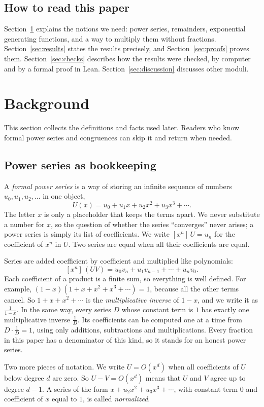 \documentclass[11pt,a4paper]{article}
\theoremstyle{definition}
\theoremstyle{remark}
\newcommand{\coeff}[2]{[x^{#1}]\,#2}
\begin{document}
\subsection{How to read this paper}
Section~\ref{sec:background} explains the notions we need: power series, remainders, exponential generating
functions, and a way to multiply them without fractions. Section~\ref{sec:results} states the results precisely, and
Section~\ref{sec:proofs} proves them. Section~\ref{sec:checks} describes how the results were checked, by computer
and by a formal proof in Lean. Section~\ref{sec:discussion} discusses other moduli.
\section{Background}\label{sec:background}
This section collects the definitions and facts used later. Readers who know formal power series and congruences can skip it and return when needed.
\subsection{Power series as bookkeeping}
A \emph{formal power series} is a way of storing an infinite sequence of numbers $u_0,u_1,u_2,\dots$ in one object,
\[
U(x)=u_0+u_1x+u_2x^2+u_3x^3+\cdots .
\]
The letter $x$ is only a placeholder that keeps the terms apart. We never substitute a number for $x$, so the question
of whether the series ``converges'' never arises; a power series is simply its list of coefficients. We write
$\coeff{n}{U}=u_n$ for the coefficient of $x^n$ in $U$. Two series are equal when all their coefficients are equal.

Series are added coefficient by coefficient and multiplied like polynomials:
\[
\coeff{n}{(UV)}=u_0v_n+u_1v_{n-1}+\cdots+u_nv_0 .
\]
Each coefficient of a product is a finite sum, so everything is well defined. For example,
$(1-x)(1+x+x^2+x^3+\cdots)=1$, because all the other terms cancel. So $1+x+x^2+\cdots$ is the
\emph{multiplicative inverse} of $1-x$, and we write it as $\frac{1}{1-x}$. In the same way, every series $D$ whose
constant term is $1$ has exactly one multiplicative inverse $\frac1D$. Its coefficients can be computed one at a time
from $D\cdot\frac1D=1$, using only additions, subtractions and multiplications. Every fraction in this paper has a
denominator of this kind, so it stands for an honest power series.

Two more pieces of notation. We write $U=O(x^d)$ when all coefficients of $U$ below degree $d$ are zero. So
$U-V=O(x^d)$ means that $U$ and $V$ agree up to degree $d-1$. A series of the form $x+u_2x^2+u_3x^3+\cdots$, with
constant term $0$ and coefficient of $x$ equal to $1$, is called \emph{normalized}.
\end{document}

